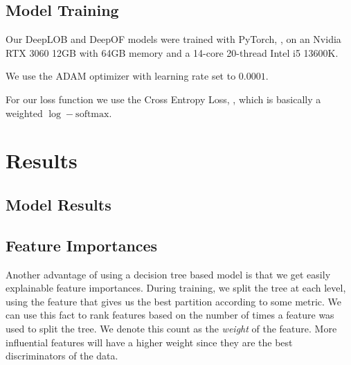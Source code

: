 \documentclass[a4paper, oneside, notitlepage]{book}
\begin{document}
\subsection{Model Training}
Our DeepLOB and DeepOF models were trained with PyTorch, \cite{PYTORCH2017},
on an Nvidia RTX 3060 12GB with 64GB memory and a 14-core 20-thread Intel i5 13600K.

We use the ADAM optimizer with learning rate set to $0.0001$.

For our loss function we use the Cross Entropy Loss, \cite{CROSSENTROPYLOSS},
which is basically a weighted $\log-\text{softmax}$.

\section{Results}

\subsection{Model Results}


\subsection{Feature Importances}
Another advantage of using a decision tree based model is that we get easily explainable
feature importances. During training, we split the tree at each level, using the feature
that gives us the best partition according to some metric. We can use this fact
to rank features based on the number of times a feature was used to split the tree. We
denote this count as the \textit{weight} of the feature.
More influential features will have a higher weight since they are the best discriminators
of the data.
\end{document}
